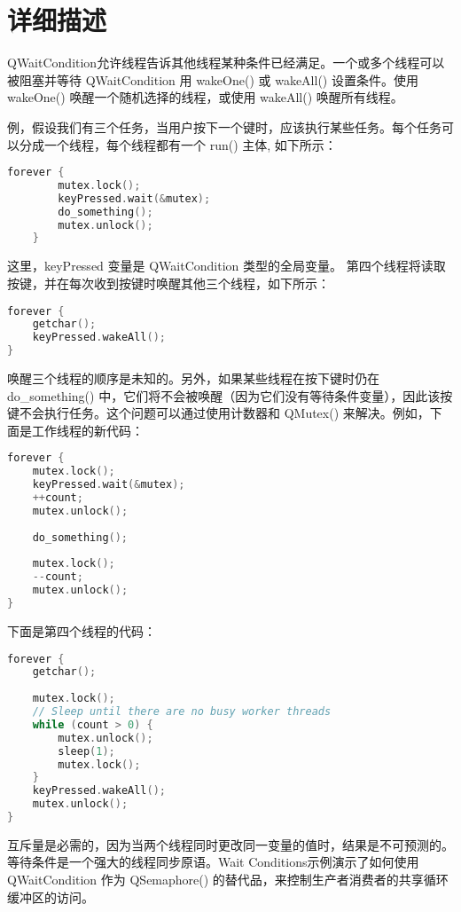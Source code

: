 \section{详细描述}

QWaitCondition允许线程告诉其他线程某种条件已经满足。一个或多个线程可以被阻塞并等待 QWaitCondition 用 wakeOne() 或 wakeAll() 设置条件。使用 wakeOne() 唤醒一个随机选择的线程，或使用 wakeAll() 唤醒所有线程。

例，假设我们有三个任务，当用户按下一个键时，应该执行某些任务。每个任务可以分成一个线程，每个线程都有一个 run() 主体, 如下所示：

\begin{lstlisting}[language=C++]
	forever {
		mutex.lock();
		keyPressed.wait(&mutex);
		do_something();
		mutex.unlock();
	}
\end{lstlisting}

这里，keyPressed 变量是 QWaitCondition 类型的全局变量。
第四个线程将读取按键，并在每次收到按键时唤醒其他三个线程，如下所示：

\begin{lstlisting}[language=C++]
forever {
	getchar();
	keyPressed.wakeAll();
}
\end{lstlisting}

唤醒三个线程的顺序是未知的。另外，如果某些线程在按下键时仍在 do\_something() 中，它们将不会被唤醒（因为它们没有等待条件变量），因此该按键不会执行任务。这个问题可以通过使用计数器和 QMutex() 来解决。例如，下面是工作线程的新代码：

\begin{lstlisting}[language=C++]
forever {
	mutex.lock();
	keyPressed.wait(&mutex);
	++count;
	mutex.unlock();
	
	do_something();
	
	mutex.lock();
	--count;
	mutex.unlock();
}
\end{lstlisting}

下面是第四个线程的代码：

\begin{lstlisting}[language=C++]
forever {
	getchar();
	
	mutex.lock();
	// Sleep until there are no busy worker threads
	while (count > 0) {
		mutex.unlock();
		sleep(1);
		mutex.lock();
	}
	keyPressed.wakeAll();
	mutex.unlock();
}
\end{lstlisting}

互斥量是必需的，因为当两个线程同时更改同一变量的值时，结果是不可预测的。
等待条件是一个强大的线程同步原语。Wait Conditions示例演示了如何使用 QWaitCondition 作为 QSemaphore() 的替代品，来控制生产者消费者的共享循环缓冲区的访问。

